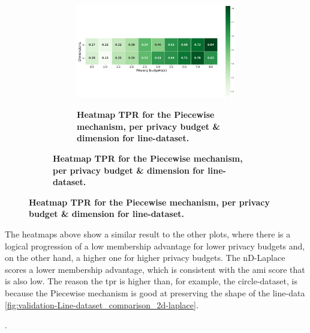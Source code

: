 {\begin{figure}[H]
\begin{subfigure}[b]{0.9\textwidth}
\begin{subfigure}[c]{1\textwidth}
            \label{fig:privacy_tpr_line-dataset_adversial_advantage_kd-laplace}
        \end{subfigure}
        \vfill %

        \begin{subfigure}[c]{1\textwidth}
            \caption{\textbf{Heatmap TPR for the Piecewise mechanism, per privacy budget \& dimension for line-dataset.}}
            \includegraphics[width=1\textwidth]{Results/nd-laplace/piecewise/line-dataset/tpr.png}
            \label{fig:privacy_tpr_line-dataset_adversial_advantage_piecewise}
        \end{subfigure}
    \end{subfigure}
\end{figure}
The heatmaps above show a similar result to the other plots, where there is a logical progression of a low membership advantage for lower privacy budgets and, on the other hand, a higher one for higher privacy budgets.
The nD-Laplace scores a lower membership advantage, which is consistent with the \gls{ami} score that is also low.
The reason the \gls{tpr} is higher than, for example, the circle-dataset, is because the Piecewise mechanism is good at preserving the shape of the line-data \ref{fig:validation-Line-dataset_comparison_2d-laplace}.}. 
\newpage
